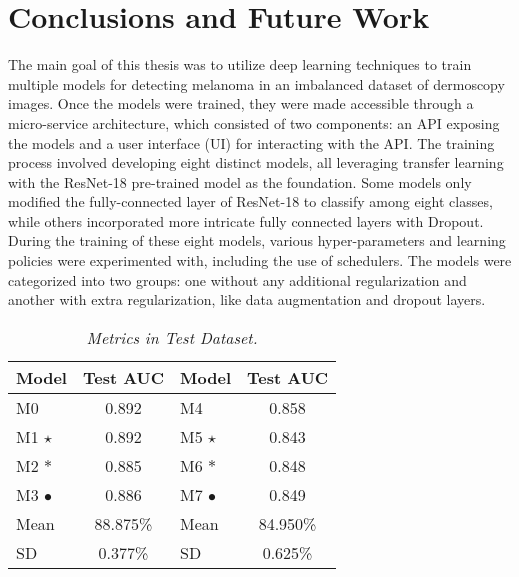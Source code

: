 \chapter{Conclusions and Future Work}
\label{cap:concl}

The main goal of this thesis was to utilize deep learning techniques to train
multiple models for detecting melanoma in an imbalanced dataset of dermoscopy
images. Once the models were trained, they were made accessible through a
micro-service architecture, which consisted of two components: an API exposing
the models and a user interface (UI) for interacting with the API. The training
process involved developing eight distinct models, all leveraging transfer
learning with the ResNet-18 pre-trained model as the foundation. Some models
only modified the fully-connected layer of ResNet-18 to classify among eight
classes, while others incorporated more intricate fully connected layers with
Dropout. \\

During the training of these eight models, various hyper-parameters and learning
policies were experimented with, including the use of schedulers. The models
were categorized into two groups: one without any additional regularization and
another with extra regularization, like data augmentation and dropout layers.


\begin{table}[H]
\centering
\begin{tabular}{lc|lc}
    \toprule
  \textbf{Model} & \textbf{Test AUC} & \cellcolor{gray!50}\textbf{Model} & \cellcolor{gray!50}\textbf{Test AUC}  \\
\midrule
 M0 & 0.892 & \cellcolor{gray!50}M4 & \cellcolor{gray!50}0.858 \\
 M1 $\star$ & 0.892 & \cellcolor{gray!50}M5 $\star$ & \cellcolor{gray!50}0.843 \\
 M2 $\ast$ &  0.885 &  \cellcolor{gray!50}M6 $\ast$ & \cellcolor{gray!50}0.848 \\
 M3 $\bullet$ & 0.886 & \cellcolor{gray!50}M7 $\bullet$ & \cellcolor{gray!50}0.849 \\
 \midrule
Mean &  88.875\% & \cellcolor{gray!50}Mean & \cellcolor{gray!50}84.950\%  \\
SD &  0.377\%  &   \cellcolor{gray!50}SD &  \cellcolor{gray!50}0.625\%  \\

\bottomrule
\end{tabular}
\caption[Metrics in Test Dataset]
  {\textit{Metrics in Test Dataset.}}
{\label{table:test-set-resume-metrics}}
\end{table}

